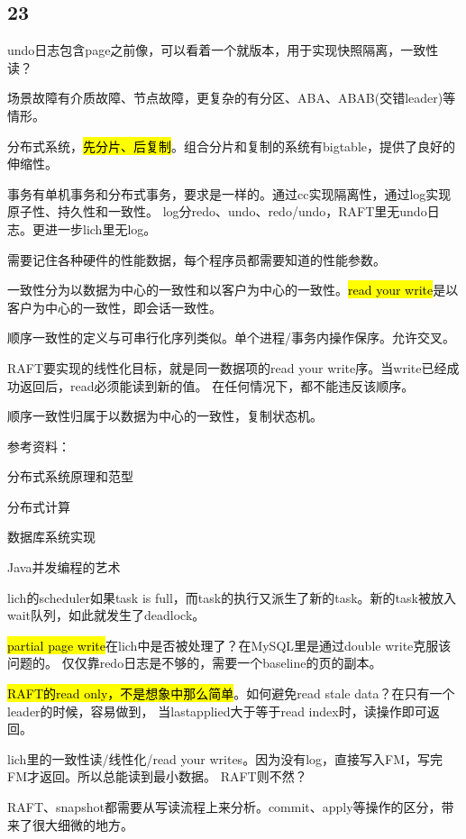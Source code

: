 \subsection{23}

undo日志包含page之前像，可以看着一个就版本，用于实现快照隔离，一致性读？

场景故障有介质故障、节点故障，更复杂的有分区、ABA、ABAB(交错leader)等情形。

分布式系统，\hl{先分片、后复制}。组合分片和复制的系统有bigtable，提供了良好的伸缩性。

事务有单机事务和分布式事务，要求是一样的。通过cc实现隔离性，通过log实现原子性、持久性和一致性。
log分redo、undo、redo/undo，RAFT里无undo日志。更进一步lich里无log。

需要记住各种硬件的性能数据，每个程序员都需要知道的性能参数。

一致性分为以数据为中心的一致性和以客户为中心的一致性。\hl{read your write}是以客户为中心的一致性，即会话一致性。

顺序一致性的定义与可串行化序列类似。单个进程/事务内操作保序。允许交叉。

RAFT要实现的线性化目标，就是同一数据项的read your write序。当write已经成功返回后，read必须能读到新的值。
在任何情况下，都不能违反该顺序。

顺序一致性归属于以数据为中心的一致性，复制状态机。

参考资料：
\begin{enumbox}
\item 分布式系统原理和范型
\item 分布式计算
\item 数据库系统实现
\item Java并发编程的艺术
\end{enumbox}

\hrulefill

lich的scheduler如果task is full，而task的执行又派生了新的task。新的task被放入wait队列，如此就发生了deadlock。

\hl{partial page write}在lich中是否被处理了？在MySQL里是通过double write克服该问题的。
仅仅靠redo日志是不够的，需要一个baseline的页的副本。

\hl{RAFT的read only，不是想象中那么简单}。如何避免read stale data？在只有一个leader的时候，容易做到，
当lastapplied大于等于read index时，读操作即可返回。

lich里的一致性读/线性化/read your writes。因为没有log，直接写入FM，写完FM才返回。所以总能读到最小数据。
RAFT则不然？

RAFT、snapshot都需要从写读流程上来分析。commit、apply等操作的区分，带来了很大细微的地方。

